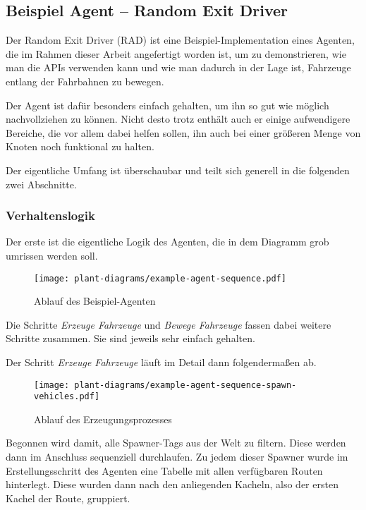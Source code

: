 
\subsection{Beispiel Agent – Random Exit Driver}

Der Random Exit Driver (RAD) ist eine Beispiel-Implementation eines Agenten, die im Rahmen dieser Arbeit angefertigt worden ist, um zu demonstrieren, wie man die APIs verwenden kann und wie man dadurch in der Lage ist, Fahrzeuge entlang der Fahrbahnen zu bewegen.

Der Agent ist dafür besonders einfach gehalten, um ihn so gut wie möglich nachvollziehen zu können.
Nicht desto trotz enthält auch er einige aufwendigere Bereiche, die vor allem dabei helfen sollen, ihn auch bei einer größeren Menge von Knoten noch funktional zu halten.

Der eigentliche Umfang ist überschaubar und teilt sich generell in die folgenden zwei Abschnitte.

\subsubsection{Verhaltenslogik}

Der erste ist die eigentliche Logik des Agenten, die in dem Diagramm  grob umrissen werden soll.

\begin{figure}[htb]
    \centering
    \texttt{[image: plant-diagrams/example-agent-sequence.pdf]}
    \caption{Ablauf des Beispiel-Agenten}
    \ownsource
    \label{fig:example-agent-sequence}
\end{figure}

\FloatBarrier

Die Schritte \textit{Erzeuge Fahrzeuge} und \textit{Bewege Fahrzeuge} fassen dabei weitere Schritte zusammen.
Sie sind jeweils sehr einfach gehalten.

Der Schritt \textit{Erzeuge Fahrzeuge} läuft im Detail dann folgendermaßen ab.

\begin{figure}[htb]
    \centering
    \texttt{[image: plant-diagrams/example-agent-sequence-spawn-vehicles.pdf]}
    \caption{Ablauf des Erzeugungsprozesses}
    \ownsource
    \label{fig:example-agent-sequence-spawn-vehicle}
\end{figure}

\FloatBarrier

Begonnen wird damit, alle Spawner-Tags aus der Welt zu filtern.
Diese werden dann im Anschluss sequenziell durchlaufen.
Zu jedem dieser Spawner wurde im Erstellungsschritt des Agenten eine Tabelle mit allen verfügbaren Routen hinterlegt.
Diese wurden dann nach den anliegenden Kacheln, also der ersten Kachel der Route, gruppiert.

